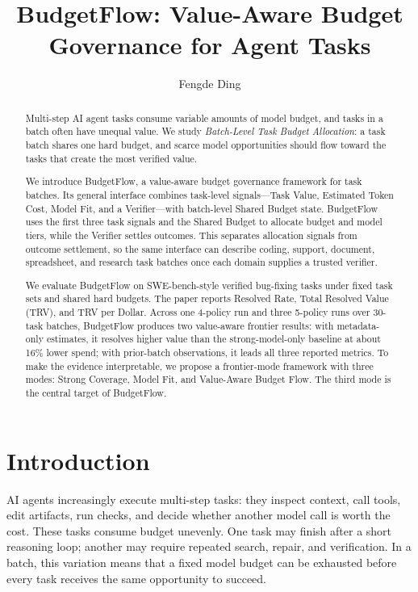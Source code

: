 \documentclass[sigconf,review,anonymous]{acmart}
\title{BudgetFlow: Value-Aware Budget Governance for Agent Tasks}
\author{Fengde Ding}
\affiliation{%
  \institution{University of International Relations}
  \country{China}
}
\newcommand{\method}{BudgetFlow\xspace}
\newcommand{\trv}{TRV\xspace}
\newcommand{\taskvalue}{Task Value\xspace}
\newcommand{\tokencost}{Estimated Token Cost\xspace}
\newcommand{\modelfit}{Model Fit\xspace}
\newcommand{\sharedbudget}{Shared Budget\xspace}
\newcommand{\verifier}{Verifier\xspace}
\begin{document}
\begin{abstract}
Multi-step AI agent tasks consume variable amounts of model budget, and tasks in a batch often have unequal value. We study \emph{Batch-Level Task Budget Allocation}: a task batch shares one hard budget, and scarce model opportunities should flow toward the tasks that create the most verified value.

We introduce \method, a value-aware budget governance framework for task batches. Its general interface combines task-level signals---\taskvalue, \tokencost, \modelfit, and a \verifier---with batch-level \sharedbudget state. \method uses the first three task signals and the \sharedbudget to allocate budget and model tiers, while the \verifier settles outcomes. This separates allocation signals from outcome settlement, so the same interface can describe coding, support, document, spreadsheet, and research task batches once each domain supplies a trusted verifier.

We evaluate \method on SWE-bench-style verified bug-fixing tasks under fixed task sets and shared hard budgets. The paper reports Resolved Rate, Total Resolved Value (\trv), and \trv per Dollar. Across one 4-policy run and three 5-policy runs over 30-task batches, \method produces two value-aware frontier results: with metadata-only estimates, it resolves higher value than the strong-model-only baseline at about 16\% lower spend; with prior-batch observations, it leads all three reported metrics. To make the evidence interpretable, we propose a frontier-mode framework with three modes: Strong Coverage, Model Fit, and Value-Aware Budget Flow. The third mode is the central target of \method.
\end{abstract}

\maketitle

\section{Introduction}
AI agents increasingly execute multi-step tasks: they inspect context, call tools, edit artifacts, run checks, and decide whether another model call is worth the cost. These tasks consume budget unevenly. One task may finish after a short reasoning loop; another may require repeated search, repair, and verification. In a batch, this variation means that a fixed model budget can be exhausted before every task receives the same opportunity to succeed.
\end{document}
